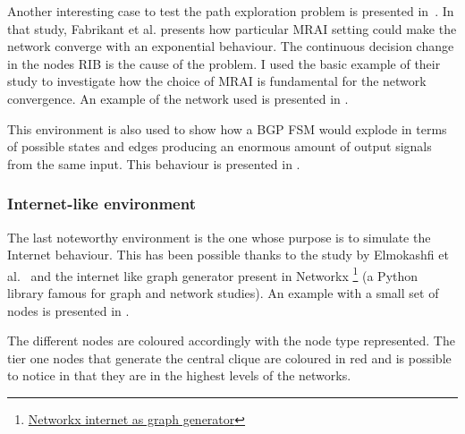 Another interesting case to test the path exploration problem is
presented in~\cite{fabrikant2011there}.
In that study, Fabrikant et al. presents how particular \ac{MRAI} setting could
make the network converge with an exponential behaviour. The continuous decision
change in the nodes \ac{RIB} is the cause of the problem.
I used the basic example of their study to investigate how the choice of \ac{MRAI}
is fundamental for the network convergence.
An example of the network used is presented in .


This environment is also used to show how a \ac{BGP} \ac{FSM} would explode
in terms of possible states and edges producing an enormous amount of
output signals from the same input.
This behaviour is presented in .

\subsubsection{Internet-like environment}
\label{subsec:internet_like_env}

The last noteworthy environment is the one whose purpose is to simulate the Internet
behaviour.
This has been possible thanks to the study by Elmokashfi et al.~\cite{elmokashfi2010scalability}
and the internet like graph generator present in Networkx \footnote{\href{https://networkx.org/documentation/stable/reference/generated/networkx.generators.internet_as_graphs.random_internet_as_graph.html\#networkx.generators.internet_as_graphs.random_internet_as_graph}{Networkx internet as graph generator}}
(a Python library famous for graph and network studies).
An example with a small set of nodes is presented in .

The different nodes are coloured accordingly with the node type represented.
The tier one nodes that generate the central clique are coloured in red and
is possible to notice in  that they are
in the highest levels of the networks.

